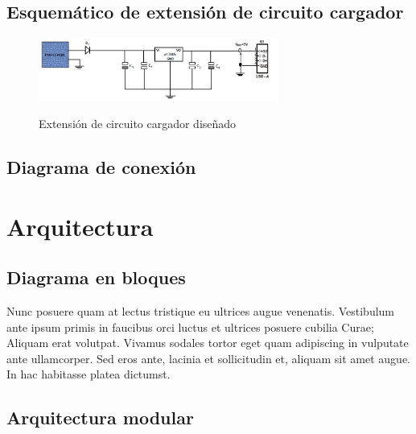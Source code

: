 \subsection{Esquemático de extensión de circuito cargador}
\label{sec:extensión}
\begin{figure}[h!]
	\centering
    \includegraphics[width=0.7\textwidth]{./Figures/circuito.jpg}
	\label{fig:GANTT3}
	\caption{Extensión de circuito cargador diseñado}
\end{figure}
\subsection{Diagrama de conexión}
\label{sec:conexión}


\section{Arquitectura}
\label{sec:arq}

\subsection{Diagrama en bloques}

Nunc posuere quam at lectus tristique eu ultrices augue venenatis. Vestibulum ante ipsum primis in faucibus orci luctus et ultrices posuere cubilia Curae; Aliquam erat volutpat. Vivamus sodales tortor eget quam adipiscing in vulputate ante ullamcorper. Sed eros ante, lacinia et sollicitudin et, aliquam sit amet augue. In hac habitasse platea dictumst.

\subsection{Arquitectura modular}


